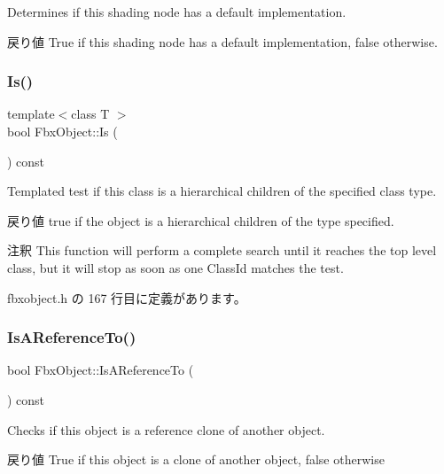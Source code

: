 Determines if this shading node has a default implementation. \begin{DoxyReturn}{戻り値}
{\ttfamily True} if this shading node has a default implementation, {\ttfamily false} otherwise. 
\end{DoxyReturn}
\mbox{\label{class_fbx_object_a65e47d62ed950247cd097b3b505d7b48}} 
\subsubsection{\texorpdfstring{Is()}{Is()}}
{\footnotesize\ttfamily template$<$class T $>$ \\
bool Fbx\+Object\+::\+Is (\begin{DoxyParamCaption}{ }\end{DoxyParamCaption}) const\hspace{0.3cm}{\ttfamily [inline]}}

Templated test if this class is a hierarchical children of the specified class type. \begin{DoxyReturn}{戻り値}
{\ttfamily true} if the object is a hierarchical children of the type specified. 
\end{DoxyReturn}
\begin{DoxyRemark}{注釈}
This function will perform a complete search until it reaches the top level class, but it will stop as soon as one Class\+Id matches the test. 
\end{DoxyRemark}


 fbxobject.\+h の 167 行目に定義があります。

\mbox{\label{class_fbx_object_a5898e582711f3266ac3d0f779d541ef6}} 
\subsubsection{\texorpdfstring{Is\+A\+Reference\+To()}{IsAReferenceTo()}}
{\footnotesize\ttfamily bool Fbx\+Object\+::\+Is\+A\+Reference\+To (\begin{DoxyParamCaption}{ }\end{DoxyParamCaption}) const}

Checks if this object is a reference clone of another object. \begin{DoxyReturn}{戻り値}
{\ttfamily True} if this object is a clone of another object, {\ttfamily false} otherwise 
\end{DoxyReturn}
\mbox{\label{class_fbx_object_a06725964170902b4d79453d76326fc5b}} 

